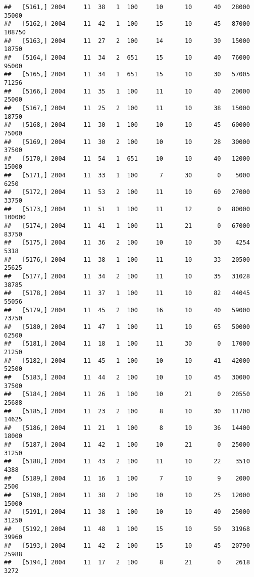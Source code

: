 \documentclass{article}\usepackage[]{graphicx}\usepackage[]{color}
\makeatletter
\newenvironment{kframe}{%
 \def\at@end@of@kframe{}%
 \ifinner\ifhmode%
  \def\at@end@of@kframe{\end{minipage}}%
  \begin{minipage}{\columnwidth}%
 \fi\fi%
 \def\FrameCommand##1{\hskip\@totalleftmargin \hskip-\fboxsep
 \colorbox{shadecolor}{##1}\hskip-\fboxsep
     \hskip-\linewidth \hskip-\@totalleftmargin \hskip\columnwidth}%
 \MakeFramed {\advance\hsize-\width
   \@totalleftmargin\z@ \linewidth\hsize
   \@setminipage}}%
 {\par\unskip\endMakeFramed%
 \at@end@of@kframe}
\newenvironment{knitrout}{}{} %
\makeatother
\begin{document}
\begin{knitrout}
\begin{kframe}
\begin{verbatim}
##   [5161,] 2004     11  38   1  100     10      10      40   28000   35000
##   [5162,] 2004     11  42   1  100     15      10      45   87000  108750
##   [5163,] 2004     11  27   2  100     14      10      30   15000   18750
##   [5164,] 2004     11  34   2  651     15      10      40   76000   95000
##   [5165,] 2004     11  34   1  651     15      10      30   57005   71256
##   [5166,] 2004     11  35   1  100     11      10      40   20000   25000
##   [5167,] 2004     11  25   2  100     11      10      38   15000   18750
##   [5168,] 2004     11  30   1  100     10      10      45   60000   75000
##   [5169,] 2004     11  30   2  100     10      10      28   30000   37500
##   [5170,] 2004     11  54   1  651     10      10      40   12000   15000
##   [5171,] 2004     11  33   1  100      7      30       0    5000    6250
##   [5172,] 2004     11  53   2  100     11      10      60   27000   33750
##   [5173,] 2004     11  51   1  100     11      12       0   80000  100000
##   [5174,] 2004     11  41   1  100     11      21       0   67000   83750
##   [5175,] 2004     11  36   2  100     10      10      30    4254    5318
##   [5176,] 2004     11  38   1  100     11      10      33   20500   25625
##   [5177,] 2004     11  34   2  100     11      10      35   31028   38785
##   [5178,] 2004     11  37   1  100     11      10      82   44045   55056
##   [5179,] 2004     11  45   2  100     16      10      40   59000   73750
##   [5180,] 2004     11  47   1  100     11      10      65   50000   62500
##   [5181,] 2004     11  18   1  100     11      30       0   17000   21250
##   [5182,] 2004     11  45   1  100     10      10      41   42000   52500
##   [5183,] 2004     11  44   2  100     10      10      45   30000   37500
##   [5184,] 2004     11  26   1  100     10      21       0   20550   25688
##   [5185,] 2004     11  23   2  100      8      10      30   11700   14625
##   [5186,] 2004     11  21   1  100      8      10      36   14400   18000
##   [5187,] 2004     11  42   1  100     10      21       0   25000   31250
##   [5188,] 2004     11  43   2  100     11      10      22    3510    4388
##   [5189,] 2004     11  16   1  100      7      10       9    2000    2500
##   [5190,] 2004     11  38   2  100     10      10      25   12000   15000
##   [5191,] 2004     11  38   1  100     10      10      40   25000   31250
##   [5192,] 2004     11  48   1  100     15      10      50   31968   39960
##   [5193,] 2004     11  42   2  100     15      10      45   20790   25988
##   [5194,] 2004     11  17   2  100      8      21       0    2618    3272

\end{verbatim}
\end{kframe}
\end{knitrout}
\end{document}
